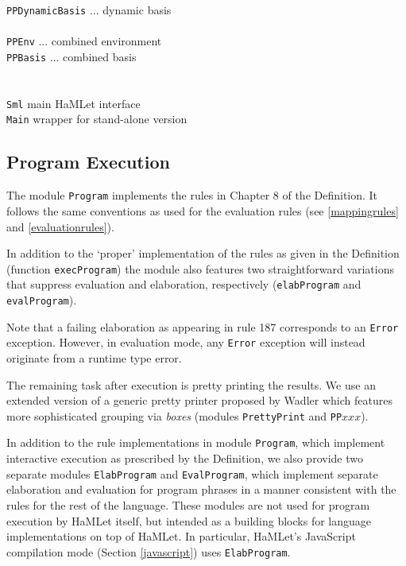 \documentclass[twoside,titlepage]{article}
\begin{document}
\begin{quoting}
\begin{tabbing}
{\tt PPDynamicBasis}		\> ... dynamic basis \\
\hspace{-1em}{\tt exec/} \\
{\tt PPEnv}			\> ... combined environment \\
{\tt PPBasis}			\> ... combined basis \\
\\
\hspace{-1em}{\tt main/} \\
{\tt Sml}			\> main HaMLet interface \\
{\tt Main}			\> wrapper for stand-alone version \\
\end{tabbing}
\end{quoting}


\subsection{Program Execution}
\label{execution}

The module {\tt Program} implements the rules in Chapter 8 of the Definition. It follows the same conventions as used for the evaluation rules (see \ref{mappingrules} and \ref{evaluationrules}).

In addition to the `proper' implementation of the rules as given in the Definition (function {\tt execProgram}) the module also features two straightforward variations that suppress evaluation and elaboration, respectively ({\tt elabProgram} and {\tt evalProgram}).

Note that a failing elaboration as appearing in rule 187 corresponds to an {\tt Error} exception. However, in evaluation mode, any {\tt Error} exception will instead originate from a runtime type error.

The remaining task after execution is pretty printing the results. We use an extended version of a generic pretty printer proposed by Wadler \cite{pretty} which features more sophisticated grouping via {\em boxes} (modules {\tt PrettyPrint} and {\tt PP}$xxx$).

In addition to the rule implementations in module {\tt Program}, which implement interactive execution as prescribed by the Definition, we also provide two separate modules {\tt ElabProgram} and {\tt EvalProgram}, which implement separate elaboration and evaluation for program phrases in a manner consistent with the rules for the rest of the language. These modules are not used for program execution by HaMLet itself, but intended as a building blocks for language implementations on top of HaMLet. In particular, HaMLet's JavaScript compilation mode (Section \ref{javascript}) uses {\tt ElabProgram}.
\end{document}
